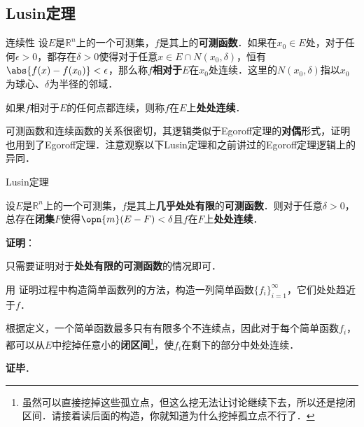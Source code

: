 \subsection{Lusin定理}

\begin{definition}{连续性}
设$E$是$\mathbb{R}^n$上的一个可测集，$f$是其上的\textbf{可测函数}．如果在$x_0\in E$处，对于任何$\epsilon>0$，都存在$\delta>0$使得对于任意$x\in E\cap N(x_0, \delta)$，恒有$\abs{f(x)-f(x_0)}<\epsilon$，那么称$f$\textbf{相对于}$E$在$x_0$处连续．这里的$N(x_0, \delta)$指以$x_0$为球心、$\delta$为半径的邻域．

如果$f$相对于$E$的任何点都连续，则称$f$在$E$上\textbf{处处连续}．
\end{definition}

可测函数和连续函数的关系很密切，其逻辑类似于Egoroff定理的\textbf{对偶}形式，证明也用到了Egoroff定理．注意观察以下Lusin定理和之前讲过的Egoroff定理逻辑上的异同．

\begin{theorem}{Lusin定理}

设$E$是$\mathbb{R}^n$上的一个可测集，$f$是其上\textbf{几乎处处有限}的\textbf{可测函数}．则对于任意$\delta>0$，总存在\textbf{闭集}$F$使得$\opn{m}(E-F)<\delta$且$f$在$F$上\textbf{处处连续}．

\end{theorem}

\textbf{证明}：

只需要证明对于\textbf{处处有限的可测函数}的情况即可．

用 证明过程中构造简单函数列的方法，构造一列简单函数$\{f_i\}_{i=1}^\infty$，它们处处趋近于$f$．

根据定义，一个简单函数最多只有有限多个不连续点，因此对于每个简单函数$f_i$，都可以从$E$中挖掉任意小的\textbf{闭区间}\footnote{虽然可以直接挖掉这些孤立点，但这么挖无法让讨论继续下去，所以还是挖闭区间．请接着读后面的构造，你就知道为什么挖掉孤立点不行了．}，使$f_i$在剩下的部分中处处连续．



\textbf{证毕}．


















